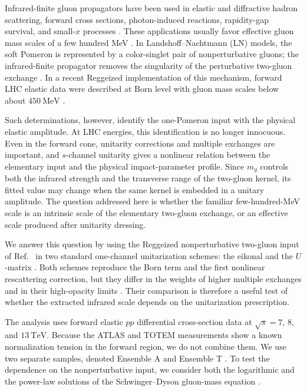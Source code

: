 \documentclass[aps,prd,twocolumn,superscriptaddress,longbibliography,nofootinbib]{revtex4-2}
\newcommand{\MeV}{\mathrm{MeV}}
\newcommand{\TeV}{\mathrm{TeV}}
\begin{document}
Infrared-finite gluon propagators have been used in elastic and diffractive hadron scattering, forward cross sections, photon-induced reactions, rapidity-gap survival, and small-$x$ processes \cite{HalzenKreinNatale1993,GayDucatiHalzenNatale1993,LunaEtAl2005,LunaNatale2006,Luna2006}.  These applications usually favor effective gluon mass scales of a few hundred MeV \cite{HalzenKreinNatale1993,LunaEtAl2005,BopsinEtAl2023}.  In Landshoff--Nachtmann (LN) models, the soft Pomeron is represented by a color-singlet pair of nonperturbative gluons; the infrared-finite propagator removes the singularity of the perturbative two-gluon exchange \cite{LandshoffNachtmann1987,HalzenKreinNatale1993,GayDucatiHalzenNatale1993}.  In a recent Reggeized implementation of this mechanism, forward LHC elastic data were described at Born level with gluon mass scales below about $450~\MeV$ \cite{BopsinEtAl2023}.

Such determinations, however, identify the one-Pomeron input with the physical elastic amplitude.  At LHC energies, this identification is no longer innocuous.  Even in the forward cone, unitarity corrections and multiple exchanges are important, and $s$-channel unitarity gives a nonlinear relation between the elementary input and the physical impact-parameter profile.  Since $m_g$ controls both the infrared strength and the transverse range of the two-gluon kernel, its fitted value may change when the same kernel is embedded in a unitary amplitude.  The question addressed here is whether the familiar few-hundred-MeV scale is an intrinsic scale of the elementary two-gluon exchange, or an effective scale produced after unitarity dressing.

We answer this question by using the Reggeized nonperturbative two-gluon input of Ref.~\cite{BopsinEtAl2023} in two standard one-channel unitarization schemes: the eikonal and the $U$-matrix \cite{BaronePredazzi,Donnachie:2002en,ForshawRoss,Troshin:2007fq}.  Both schemes reproduce the Born term and the first nonlinear rescattering correction, but they differ in the weights of higher multiple exchanges and in their high-opacity limits \cite{Maneyro:2024,LunaRyskin:2024}.  Their comparison is therefore a useful test of whether the extracted infrared scale depends on the unitarization prescription.

The analysis uses forward elastic $pp$ differential cross-section data at $\sqrt s=7$, $8$, and $13~\TeV$.  Because the ATLAS and TOTEM measurements show a known normalization tension in the forward region, we do not combine them.  We use two separate samples, denoted Ensemble A and Ensemble T \cite{ATLAS:2014,ATLAS:2016,ATLAS:2023,TOTEM:2013,TOTEM:2015,TOTEM:2019}.  To test the dependence on the nonperturbative input, we consider both the logarithmic and the power-law solutions of the Schwinger--Dyson gluon-mass equation \cite{AguilarPapavassiliou2008}.
\end{document}
